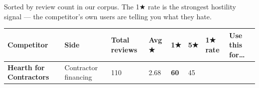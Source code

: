 \documentclass[
  10pt,
]{article}
\begin{document}
Sorted by review count in our corpus. The 1★ rate is the strongest hostility signal --- the
competitor's own users are telling you what they hate.

\begin{longtable}[]{@{}llllllll@{}}
\toprule
\begin{minipage}[b]{0.10\columnwidth}\raggedright
Competitor\strut
\end{minipage} & \begin{minipage}[b]{0.10\columnwidth}\raggedright
Side\strut
\end{minipage} & \begin{minipage}[b]{0.10\columnwidth}\raggedright
Total reviews\strut
\end{minipage} & \begin{minipage}[b]{0.10\columnwidth}\raggedright
Avg ★\strut
\end{minipage} & \begin{minipage}[b]{0.10\columnwidth}\raggedright
1★\strut
\end{minipage} & \begin{minipage}[b]{0.10\columnwidth}\raggedright
5★\strut
\end{minipage} & \begin{minipage}[b]{0.10\columnwidth}\raggedright
1★ rate\strut
\end{minipage} & \begin{minipage}[b]{0.10\columnwidth}\raggedright
Use this for\ldots{}\strut
\end{minipage}\tabularnewline
\midrule
\endhead
\begin{minipage}[t]{0.10\columnwidth}\raggedright
\textbf{Hearth for Contractors}\strut
\end{minipage} & \begin{minipage}[t]{0.10\columnwidth}\raggedright
Contractor financing\strut
\end{minipage} & \begin{minipage}[t]{0.10\columnwidth}\raggedright
110\strut
\end{minipage} & \begin{minipage}[t]{0.10\columnwidth}\raggedright
2.68\strut
\end{minipage} & \begin{minipage}[t]{0.10\columnwidth}\raggedright
\textbf{60}\strut
\end{minipage} & \begin{minipage}[t]{0.10\columnwidth}\raggedright
45\strut
\end{minipage} & \begin{minipage}[t]{0.10\columnwidth}\raggedright

\end{minipage}
\end{longtable}
\end{document}
